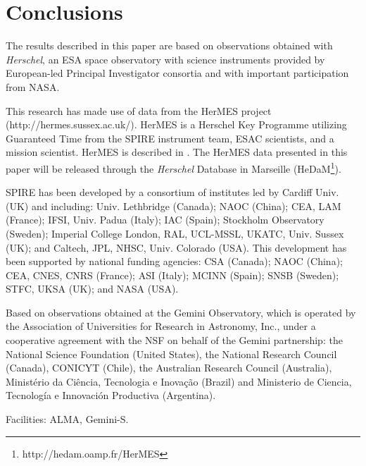 \documentclass[iop]{emulateapj}
\begin{document}
\section{Conclusions} \label{sec:conclusions}


\begin{acknowledgments}

The results described in this paper are based on observations obtained with
{\it Herschel}, an ESA space observatory with science instruments provided by
European-led Principal Investigator consortia and with important participation
from NASA.  

This research has made use of data from the HerMES project
(http://hermes.sussex.ac.uk/). HerMES is a Herschel Key Programme utilizing
Guaranteed Time from the SPIRE instrument team, ESAC scientists, and a mission
scientist. HerMES is described in \citet{Oliver:2012lr}.  The HerMES data
presented in this paper will be released through the {\em Herschel} Database in
Marseille (HeDaM\footnote{http://hedam.oamp.fr/HerMES}).

SPIRE has been developed by a consortium of institutes led by Cardiff Univ.
(UK) and including: Univ. Lethbridge (Canada); NAOC (China); CEA, LAM (France);
IFSI, Univ. Padua (Italy); IAC (Spain); Stockholm Observatory (Sweden);
Imperial College London, RAL, UCL-MSSL, UKATC, Univ. Sussex (UK); and Caltech,
JPL, NHSC, Univ. Colorado (USA). This development has been supported by
national funding agencies: CSA (Canada); NAOC (China); CEA, CNES, CNRS
(France); ASI (Italy); MCINN (Spain); SNSB (Sweden); STFC, UKSA (UK); and NASA
(USA).

Based on observations obtained at the Gemini Observatory, which is operated by
the Association of Universities for Research in Astronomy, Inc., under a
cooperative agreement with the NSF on behalf of the Gemini partnership: the
National Science Foundation (United States), the National Research Council
(Canada), CONICYT (Chile), the Australian Research Council (Australia),
Minist\'erio da Ci\^encia, Tecnologia e Inova\c{c}\~ao (Brazil) and Ministerio
de Ciencia, Tecnolog\'ia e Innovaci\'on Productiva (Argentina).  

Facilities: ALMA, Gemini-S.

\end{acknowledgments}





\end{document}
